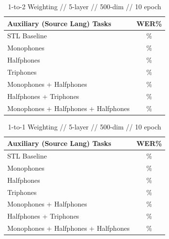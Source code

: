 \documentclass[a4paper]{article}
\begin{document}
\begin{table}[!htbp]
  \centering
    \caption{1-to-2 Weighting // 5-layer // 500-dim //  10 epoch }
  \begin{adjustbox}{width=.45\textwidth}
    \begin{tabular}{lc}
      \toprule
      \textbf{Auxiliary (Source Lang) Tasks} & \textbf{WER\%}\\
      \midrule
      STL Baseline &  \% \\
      Monophones &  \% \\
      Halfphones &  \% \\
      Triphones &  \%  \\
      Monophones + Halfphones & \%  \\
      Halfphones + Triphones & \%  \\
      Monophones + Halfphones + Halfphones & \%  \\
      \bottomrule
    \end{tabular}
    \label{table:data}
  \end{adjustbox}
\end{table}


\begin{table}[!htbp]
  \centering
    \caption{1-to-1 Weighting // 5-layer // 500-dim //  10 epoch }
  \begin{adjustbox}{width=.45\textwidth}
    \begin{tabular}{lc}
      \toprule
      \textbf{Auxiliary (Source Lang) Tasks} & \textbf{WER\%}\\
      \midrule
      STL Baseline &  \% \\
      Monophones &  \% \\
      Halfphones &  \% \\
      Triphones &  \%  \\
      Monophones + Halfphones & \%  \\
      Halfphones + Triphones & \%  \\
      Monophones + Halfphones + Halfphones & \%  \\
      \bottomrule
    \end{tabular}
    \label{table:data}
  \end{adjustbox}
\end{table}
\end{document}
